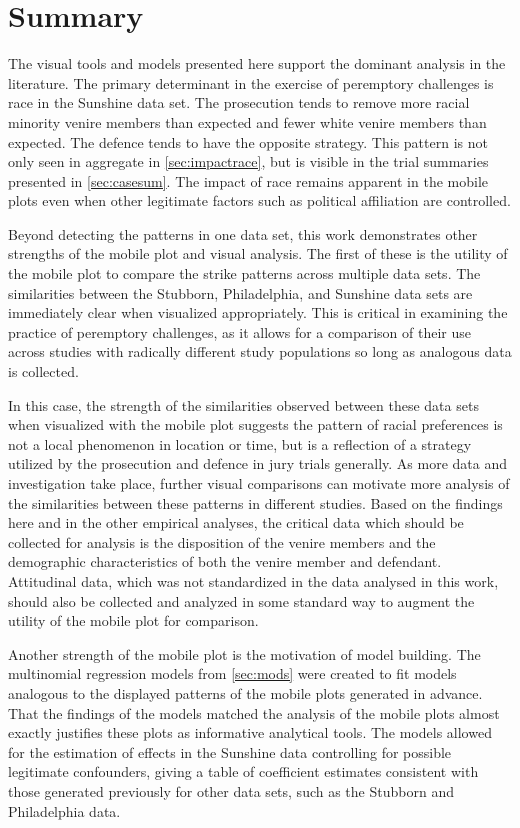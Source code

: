 \section{Summary}
\label{c:summary}

The visual tools and models presented here support the dominant analysis in the literature. The primary determinant in the
exercise of peremptory challenges is race in the Sunshine data set. The prosecution tends to remove more racial minority venire
members than expected and fewer white venire members than expected. The defence tends to have the
opposite strategy. This pattern is not only seen in aggregate in \ref{sec:impactrace}, but is visible in the trial summaries
presented in \ref{sec:casesum}. The impact of race remains apparent in the mobile plots even when other legitimate factors
such as political affiliation are controlled.

Beyond detecting the patterns in one data set, this work demonstrates other strengths of the mobile plot and visual
analysis. The first of these is the utility of the mobile plot to compare the strike patterns across multiple data sets. The
similarities between the Stubborn, Philadelphia, and Sunshine data sets are immediately clear when visualized appropriately. This
is critical in examining the practice of peremptory challenges, as it allows for a comparison of their use across studies with
radically different study populations so long as analogous data is collected.

In this case, the strength of the similarities observed between these data sets when visualized with the mobile plot suggests the
pattern of racial preferences is not a local phenomenon in location or time, but is a reflection of a strategy utilized by the
prosecution and defence in jury trials generally. As more data and investigation take place, further visual comparisons can
motivate more analysis of the similarities between these patterns in different studies. Based on the findings here and in the
other empirical analyses, the critical data which should be collected for analysis is the disposition of the venire members and
the demographic characteristics of both the venire member and
defendant. Attitudinal data, which was not standardized in the data
analysed in this work, should also be collected and analyzed in some standard way to augment the utility of the mobile plot for comparison.

Another strength of the mobile plot is the motivation of model building. The multinomial regression models from \ref{sec:mods}
were created to fit models analogous to the displayed patterns of the mobile plots generated in advance. That the findings of the
models matched the analysis of the mobile plots almost exactly justifies these plots as informative analytical tools. The models
allowed for the estimation of effects in the Sunshine data controlling for possible legitimate confounders, giving a table of
coefficient estimates consistent with those generated previously for other data sets, such as the Stubborn and Philadelphia data.

